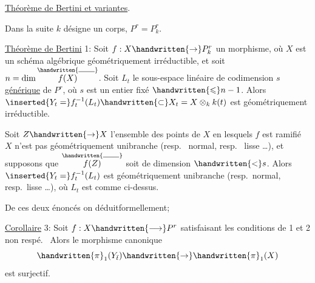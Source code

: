 
\uline{Théorème de Bertini et variantes}.

Dans la suite $k$ désigne un corps, $P^r=P^r_k$.

\uline{Théorème de Bertini} 1: Soit $f:X\handwritten{\rightarrow}P^r_k$ un morphisme, où $X$ est un schéma algébrique géométriquement irréductible, et soit $n=\dim\overset{\handwritten{\rule{1.9em}{.4pt}}}{f(X)}$. Soit $L_t$ le sous-espace linéaire de codimension $s$ \uline{générique} de $P^r$, où $s$ est un entier fixé $\handwritten{\leqslant}n-1$. Alors $\inserted{Y_t=}f_t^{-1}(L_t)\handwritten{\subset}X_t=X\otimes_k k(t)$ est géométriquement irréductible.

  Soit $Z\handwritten{\rightarrow}X$  l'ensemble des points de $X$ en lesquels  $f$ est  ramifié   $X$ n'est pas géométriquement unibranche (resp.\  normal, resp.\  lisse \ldots),  et supposons que $\overset{\handwritten{\rule{1.9em}{.4pt}}}{f(Z)}$ soit de dimension $\handwritten{<}s$. Alors $\inserted{Y_t=}f_t^{-1}(L_t)$ est géométriquement unibranche (resp.\ normal, resp.\ lisse \ldots), où $L_t$ est comme ci-dessus.

De ces deux énoncés on déduit\handwritten{/}formellement;

\uline{Corollaire} 3: Soit $f:X\handwritten{\longrightarrow}P^r$ satisfaisant les conditions de 1\handwritten{,} et 2 non respé.\  Alors le morphisme canonique
\[
\handwritten{\pi}_1(Y_{\bar{t}})\handwritten{\rightarrow}\handwritten{\pi}_1(X)
\]
est surjectif.

